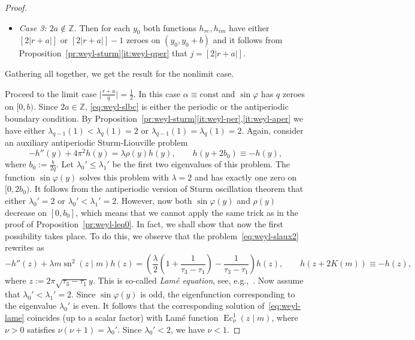 \documentclass{amsart}
\let\le\leqslant
\let\phi\varphi
\newcommand{\const}{\mathrm{const}}
\DeclareMathOperator{\Ec}{Ec}
\DeclareMathOperator{\sn}{sn}
\theoremstyle{plain}
\theoremstyle{definition}
\theoremstyle{remark}
\begin{document}
\begin{proof}
\begin{itemize}
\item\emph{Case 3: \(2a\notin\mathbb Z\).} Then for each \(y_0\) both functions
\(h_{re},h_{im}\) have either \([2|r+a|]\) or \([2|r+a|]-1\) zeroes on
\((y_0,y_0+b)\) and it follows from
Proposition~\ref{pr:weyl-sturm}\ref{it:weyl-qper} that \(j=[2|r+a|]\).
\end{itemize}

Gathering all together, we get the result for the nonlimit case.

Proceed to the limit case \(\bigl|\frac{r+a}q\bigr|=\frac{1}2\). In this case
\(\alpha\equiv\const\) and \(\sin\phi\) has \(q\) zeroes on \([0,b)\). Since
\(2a\in\mathbb Z\), \eqref{eq:weyl-slbc} is either the periodic or the
antiperiodic boundary condition. By
Proposition~\ref{pr:weyl-sturm}\ref{it:weyl-per},\ref{it:weyl-aper} we have
either \(\lambda_{q-1}(1)<\lambda_q(1)=2\) or
\(\lambda_{q-1}(1)=\lambda_q(1)=2\). Again, consider an auxiliary antiperiodic
Sturm-Liouville problem
\begin{equation}\label{eq:weyl-slaux2}
-h''(y)+4\pi^2 h(y)=\lambda\rho(y)h(y),\qquad h(y+2b_0)\equiv -h(y),
\end{equation}
where \(b_0:=\frac{b}{2q}\). Let \(\lambda_0'\le\lambda_1'\) be the first two
eigenvalues of this problem. The function \(\sin\phi(y)\) solves this problem
with \(\lambda=2\) and has exactly one zero on \([0,2b_0)\). It follows from the
antiperiodic version of Sturm oscillation theorem that either
\(\lambda_0'=2\) or \(\lambda_0'<\lambda_1'=2\). However, now both
\(\sin\phi(y)\) and \(\rho(y)\) decrease on \([0,b_0]\), which means that we
cannot apply the same trick as in the proof of Proposition~\ref{pr:weyl-leq0}.
In fact, we shall show that now the first possibility takes place. To do this,
we observe that the problem~\eqref{eq:weyl-slaux2} rewrites as
\begin{equation}\label{eq:weyl-lame}
-h''(z)+\lambda m\sn^2(z\mid m)h(z)=\left(\frac{\lambda}2\left(
1+\frac{1}{\tau_3-\tau_1}\right)-\frac{1}{\tau_3-\tau_1}\right)h(z),\qquad
h(z+2K(m))\equiv -h(z),
\end{equation}
where \(z:=2\pi\sqrt{\tau_3-\tau_1}y\). This is so-called \emph{Lam\'e
equation}, see, e.g.,~\cite{Vol2025}. Now assume that
\(\lambda_0'<\lambda_1'=2\). Since \(\sin\phi(y)\) is odd, the eigenfunction
corresponding to the eigenvalue \(\lambda_0'\) is even. It follows that the
corresponding solution of~\eqref{eq:weyl-lame} coincides (up to a scalar factor)
with Lam\'e function \(\Ec_\nu^1(z\mid m)\), where \(\nu>0\) satisfies
\(\nu(\nu+1)=\lambda_0'\). Since \(\lambda_0'<2\), we have \(\nu<1\).


\end{proof}
\end{document}

